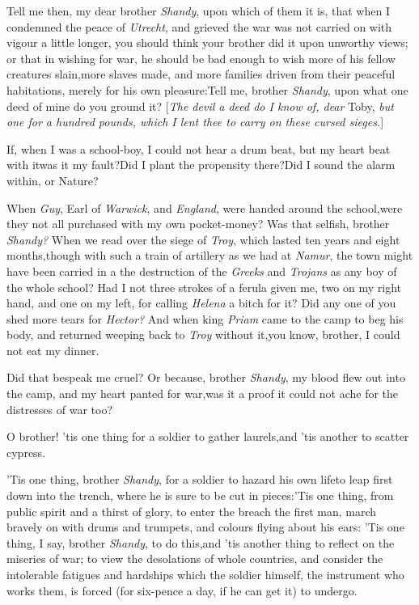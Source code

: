 \documentclass{article}
\begin{document}
Tell me then, my dear brother \textit{Shandy}, upon which of them
it is, that when I condemned the peace of \textit{Utrecht}, and
grieved the war was not carried on with vigour a little longer, you
should think your brother did it upon unworthy views; or that in
wishing for war, he should be bad enough to wish more of his
fellow creatures slain,\tsk more slaves made, and more families
driven from their peaceful habitations, merely for his own
pleasure:\tsh Tell me, brother \textit{Shandy}, upon what
one deed of mine do you ground it? [\textit{The devil a deed do I know
of, dear} Toby, \textit{but one for a hundred pounds, which I lent
thee to carry on these cursed sieges.}]

If, when I was a school-boy, I could not hear a drum beat, but
my heart beat with it\tsk was it my fault?\tsh Did I
plant the propensity there?\tsh Did I sound the alarm
within, or Nature?

When \textit{Guy}, Earl of \textit{Warwick}, and 
 \textit{England}, were handed around the
school,\break\tsk were they not all purchased with my own pocket-money?
Was that selfish, brother \textit{Shandy?} When we read over the
siege of \textit{Troy}, which lasted ten years and eight
months,\tsh though with such a train of artillery as we
had at \textit{Namur}, the town might have been carried in a
 the
destruction of the \textit{Greeks} and \textit{Trojans} as any boy of
the whole school? Had I not three strokes of a ferula given me, two
on my right hand, and one on my left, for calling \textit{Helena} a
bitch for it? Did any one of you shed more tears for \textit{Hector?}
And when king \textit{Priam} came to the camp to beg his body, and
returned weeping back to \textit{Troy} without it,\tsk you know,
brother, I could not eat my dinner.\tsh

\tsh Did that bespeak me cruel? Or because, brother
\textit{Shandy}, my blood flew out into the camp, and my heart panted
for war,\tsk was it a proof it could not ache for the distresses
of war too?

O brother! ’tis one thing for a soldier to gather
laurels,\tsk and ’tis another to scatter
cypress.

\tsh ’Tis one thing, brother \textit{Shandy},\break
for a soldier to hazard his own life\tsk to leap first down into the trench, where
he is sure to be cut in pieces:\tsh ’Tis one thing, from public spirit and a thirst
of glory, to enter the breach the first man,\break{}
march bravely on with drums and trumpets, and colours flying about his ears:\break
\tsh ’Tis one thing, I say, brother \textit{Shandy}, to do this,\tsk and ’tis another
thing to reflect on the miseries of war;\break
\tsk to view the desolations of whole
countries, and consider the intolerable fatigues and hardships which the soldier
himself, the instrument who works them, is forced (for six-pence a day, if he can get
it) to undergo.
\end{document}
